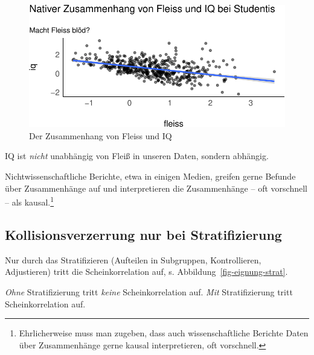 \documentclass[
  a4paper,
  DIV=11]{scrreprt}
\theoremstyle{definition}
\theoremstyle{remark}
\begin{document}
\begin{figure}

{\centering \includegraphics{./kausal_files/figure-pdf/fig-eignung-1.pdf}

}

\caption{\label{fig-eignung}Der Zusammenhang von Fleiss und IQ}

\end{figure}

IQ ist \emph{nicht} unabhängig von Fleiß in unseren Daten, sondern
abhängig.

Nichtwissenschaftliche Berichte, etwa in einigen Medien, greifen gerne
Befunde über Zusammenhänge auf und interpretieren die Zusammenhänge --
oft vorschnell -- als kausal.\footnote{Ehrlicherweise muss man zugeben,
  dass auch wissenschaftliche Berichte Daten über Zusammenhänge gerne
  kausal interpretieren, oft vorschnell.}

\hypertarget{kollisionsverzerrung-nur-bei-stratifizierung}{%
\subsection{Kollisionsverzerrung nur bei
Stratifizierung}\label{kollisionsverzerrung-nur-bei-stratifizierung}}

Nur durch das Stratifizieren (Aufteilen in Subgruppen, Kontrollieren,
Adjustieren) tritt die Scheinkorrelation auf, s.
Abbildung~\ref{fig-eignung-strat}.

\begin{tcolorbox}[enhanced jigsaw, title=\textcolor{quarto-callout-note-color}{\faInfo}\hspace{0.5em}{Hinweis}, bottomtitle=1mm, bottomrule=.15mm, titlerule=0mm, colbacktitle=quarto-callout-note-color!10!white, colframe=quarto-callout-note-color-frame, leftrule=.75mm, left=2mm, toprule=.15mm, colback=white, arc=.35mm, breakable, toptitle=1mm, opacityback=0, rightrule=.15mm, coltitle=black, opacitybacktitle=0.6]

\emph{Ohne} Stratifizierung tritt \emph{keine} Scheinkorrelation auf.
\emph{Mit} Stratifizierung tritt Scheinkorrelation auf.

\end{tcolorbox}
\end{document}
